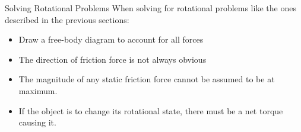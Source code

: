 \documentclass[12pt,compress,aspectratio=169]{beamer}
\begin{document}
%
%
%
%
%
%
%



\begin{frame}{Solving Rotational Problems}
  When solving for rotational problems like the ones described in the previous
  sections:
  \begin{itemize}
  \item Draw a free-body diagram to account for all forces
  \item The direction of friction force is not always obvious
  \item The magnitude of any static friction force cannot be assumed to be at
    maximum.
  \item If the object is to change its rotational state, there must be a net
    torque causing it.
  \end{itemize}
\end{frame}
\end{document}
